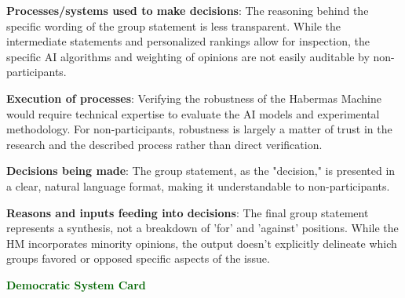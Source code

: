     \begin{noitemize}
        \item \textbf{Processes/systems used to make decisions}: The reasoning behind the specific wording of the group statement is less transparent. While the intermediate statements and personalized rankings allow for inspection, the specific AI algorithms and weighting of opinions are not easily auditable by non-participants.
        \item \textbf{Execution of processes}: Verifying the robustness of the Habermas Machine would require technical expertise to evaluate the AI models and experimental methodology. For non-participants, robustness is largely a matter of trust in the research and the described process rather than direct verification.
        \item \textbf{Decisions being made}: The group statement, as the "decision," is presented in a clear, natural language format, making it understandable to non-participants.
        \item \textbf{Reasons and inputs feeding into decisions}: The final group statement represents a synthesis, not a breakdown of 'for' and 'against' positions. While the HM incorporates minority opinions, the output doesn't explicitly delineate which groups favored or opposed specific aspects of the issue.
    \end{noitemize}
    
    

    

    
    

    

    
    

    


\clearpage
{}

    
    \begin{center}
        {\textcolor{darkgreen}{\Large\bfseries Democratic System Card}}
    \end{center}



